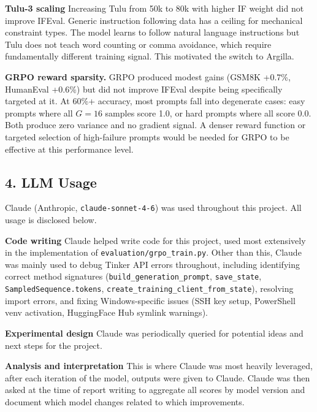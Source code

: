 \documentclass[10pt,letterpaper]{article}
\begin{document}
\textbf{Tulu-3 scaling} Increasing Tulu from 50k to 80k with 
higher IF weight did not improve IFEval. Generic instruction following data has a 
ceiling for mechanical constraint types. The model learns to follow natural language 
instructions but Tulu does not teach word counting or comma avoidance, which require 
fundamentally different training signal. This motivated the switch to Argilla.

\textbf{GRPO reward sparsity.} GRPO produced modest gains (GSM8K +0.7\%, HumanEval 
+0.6\%) but did not improve IFEval despite being specifically targeted at it. At 
60\%+ accuracy, most prompts fall into degenerate cases: easy prompts where all 
$G{=}16$ samples score 1.0, or hard prompts where all score 0.0. Both produce zero 
variance and no gradient signal. A denser reward function or targeted selection of 
high-failure prompts would be needed for GRPO to be effective at this performance 
level.



\vfill

\newpage

\subsection*{4. LLM Usage}

Claude (Anthropic, \texttt{claude-sonnet-4-6}) was used throughout this project. All usage is disclosed below.

\textbf{Code writing} Claude helped write code for this project, used most extensively in the implementation of \texttt{evaluation/grpo\_train.py}. Other than this, Claude was mainly used to debug Tinker API errors throughout, including identifying correct method signatures (\texttt{build\_generation\_prompt}, \texttt{save\_state}, \texttt{SampledSequence.tokens}, \texttt{create\_training\_client\_from\_state}), resolving import errors, and fixing Windows-specific issues (SSH key setup, PowerShell venv activation, HuggingFace Hub symlink warnings).

\textbf{Experimental design} Claude was periodically queried for potential ideas and next steps for the project.

\textbf{Analysis and interpretation} This is where Claude was most heavily leveraged, after each iteration of the model, outputs were given to Claude. Claude was then asked at the time of report writing to aggregate all scores by model version and document which model changes related to which improvements.
\end{document}
